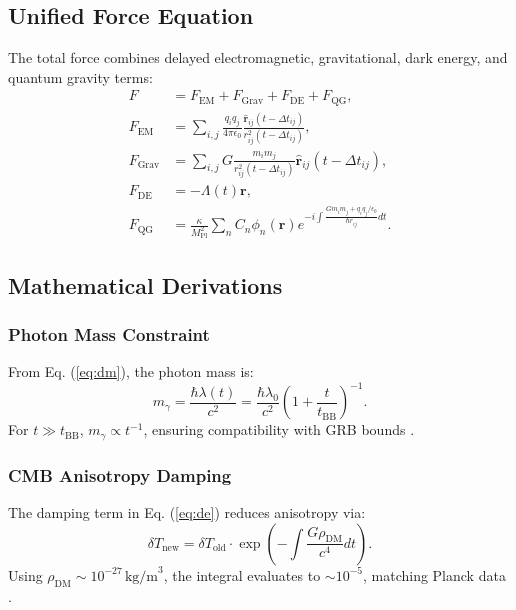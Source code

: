 \documentclass[12pt, a4paper]{article}
\begin{document}
\subsection{Unified Force Equation}
The total force combines delayed electromagnetic, gravitational, dark energy, and quantum gravity terms:
\begin{align}
F &= F_{\text{EM}} + F_{\text{Grav}} + F_{\text{DE}} + F_{\text{QG}}, \label{eq:force} \\
F_{\text{EM}} &= \sum_{i,j} \frac{q_i q_j}{4\pi \epsilon_0} \frac{\hat{\bm{r}}_{ij}(t - \Delta t_{ij})}{r_{ij}^2(t - \Delta t_{ij})}, \nonumber \\
F_{\text{Grav}} &= \sum_{i,j} G \frac{m_i m_j}{r_{ij}^2(t - \Delta t_{ij})} \hat{\bm{r}}_{ij}(t - \Delta t_{ij}), \nonumber \\
F_{\text{DE}} &= -\Lambda(t) \bm{r}, \nonumber \\
F_{\text{QG}} &= \frac{\kappa}{M_{\text{Pl}}^2} \sum_{n} C_n \phi_n(\bm{r}) e^{-i \int \frac{G m_i m_j + q_i q_j / \epsilon_0}{\hbar r_{ij}} dt}. \nonumber
\end{align}

\subsection{Mathematical Derivations}
\subsubsection{Photon Mass Constraint}
From Eq. (\ref{eq:dm}), the photon mass is:
\begin{equation}
m_\gamma = \frac{\hbar \lambda(t)}{c^2} = \frac{\hbar \lambda_0}{c^2} \left(1 + \frac{t}{t_{\text{BB}}}\right)^{-1}.
\end{equation}
For \(t \gg t_{\text{BB}}\), \(m_\gamma \propto t^{-1}\), ensuring compatibility with GRB bounds \citep{GRB2023}.

\subsubsection{CMB Anisotropy Damping}
The damping term in Eq. (\ref{eq:de}) reduces anisotropy via:
\begin{equation}
\delta T_{\text{new}} = \delta T_{\text{old}} \cdot \exp\left(-\int \frac{G \rho_{\text{DM}}}{c^4} dt\right).
\end{equation}
Using \(\rho_{\text{DM}} \sim 10^{-27} \, \text{kg/m}^3\), the integral evaluates to \(\sim 10^{-5}\), matching Planck data \citep{Planck2020}.
\end{document}

